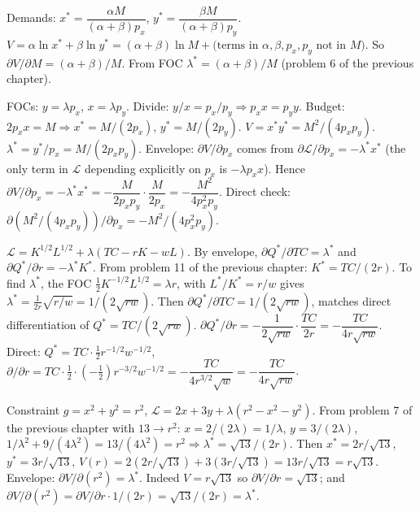 \begin{solutions}
  \item Demands: $x^* = \dfrac{\alpha M}{(\alpha + \beta) p_x}$,
        $y^* = \dfrac{\beta M}{(\alpha + \beta) p_y}$.
        $V = \alpha \ln x^* + \beta \ln y^* = (\alpha + \beta) \ln M
        + \text{(terms in $\alpha, \beta, p_x, p_y$ not in $M$)}$. So
        $\partial V/\partial M = (\alpha + \beta)/M$. From FOC
        $\lambda^* = (\alpha + \beta)/M$ (problem 6 of the previous
        chapter). \checkmark

  \item FOCs: $y = \lambda p_x$, $x = \lambda p_y$. Divide:
        $y/x = p_x/p_y \Rightarrow p_x x = p_y y$. Budget:
        $2 p_x x = M \Rightarrow x^* = M/(2 p_x)$, $y^* = M/(2 p_y)$.
        $V = x^* y^* = M^2/(4 p_x p_y)$.
        $\lambda^* = y^*/p_x = M/(2 p_x p_y)$. Envelope:
        $\partial V/\partial p_x$ comes from
        $\partial \mathcal{L}/\partial p_x = -\lambda^* x^*$ (the only
        term in $\mathcal{L}$ depending explicitly on $p_x$ is
        $-\lambda p_x x$). Hence
        $\partial V/\partial p_x = -\lambda^* x^*
        = -\dfrac{M}{2 p_x p_y} \cdot \dfrac{M}{2 p_x}
        = -\dfrac{M^2}{4 p_x^2 p_y}$. Direct check:
        $\partial(M^2/(4 p_x p_y))/\partial p_x = -M^2/(4 p_x^2 p_y)$.
        \checkmark

  \item $\mathcal{L} = K^{1/2} L^{1/2} + \lambda(TC - r K - w L)$. By
        envelope, $\partial Q^*/\partial TC = \lambda^*$ and
        $\partial Q^*/\partial r = -\lambda^* K^*$. From problem 11 of the
        previous chapter: $K^* = TC/(2 r)$. To find $\lambda^*$, the FOC
        $\tfrac{1}{2} K^{-1/2} L^{1/2} = \lambda r$, with $L^*/K^* = r/w$
        gives $\lambda^* = \tfrac{1}{2 r} \sqrt{r/w} = 1/(2 \sqrt{r w})$.
        Then $\partial Q^*/\partial TC = 1/(2 \sqrt{r w})$, matches
        direct differentiation of $Q^* = TC/(2 \sqrt{r w})$.
        $\partial Q^*/\partial r = -\dfrac{1}{2 \sqrt{r w}} \cdot
        \dfrac{TC}{2 r} = -\dfrac{TC}{4 r \sqrt{r w}}$. Direct:
        $Q^* = TC \cdot \tfrac{1}{2} r^{-1/2} w^{-1/2}$,
        $\partial/\partial r = TC \cdot \tfrac{1}{2} \cdot
        (-\tfrac{1}{2}) r^{-3/2} w^{-1/2}
        = -\dfrac{TC}{4 r^{3/2} \sqrt{w}}
        = -\dfrac{TC}{4 r \sqrt{r w}}$. \checkmark

  \item Constraint $g = x^2 + y^2 = r^2$,
        $\mathcal{L} = 2 x + 3 y + \lambda(r^2 - x^2 - y^2)$. From
        problem 7 of the previous chapter with $13 \to r^2$:
        $x = 2/(2 \lambda) = 1/\lambda$, $y = 3/(2 \lambda)$,
        $1/\lambda^2 + 9/(4 \lambda^2) = 13/(4 \lambda^2) = r^2
        \Rightarrow \lambda^* = \sqrt{13}/(2 r)$. Then
        $x^* = 2 r/\sqrt{13}$, $y^* = 3 r/\sqrt{13}$,
        $V(r) = 2(2 r/\sqrt{13}) + 3(3 r/\sqrt{13}) = 13 r/\sqrt{13}
        = r \sqrt{13}$. Envelope:
        $\partial V/\partial (r^2) = \lambda^*$. Indeed $V = r \sqrt{13}$
        so $\partial V/\partial r = \sqrt{13}$; and
        $\partial V/\partial(r^2) = \partial V/\partial r \cdot 1/(2 r)
        = \sqrt{13}/(2 r) = \lambda^*$. \checkmark


\end{solutions}
